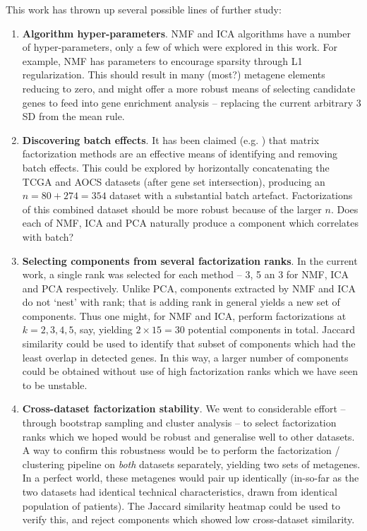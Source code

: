 \documentclass[draft, tikz, 12pt,a4paper,oneside,fleqn]{article}
\begin{document}
This work has thrown up several possible lines of further study:
\begin{enumerate}
\item
{\bf Algorithm hyper-parameters}.  NMF and ICA algorithms have a number of hyper-parameters, only a few of which were explored in this work.  For example, NMF has parameters to encourage sparsity through L1 regularization.   This should result in many (most?) metagene elements reducing to zero, and might offer a more robust means of selecting candidate genes to feed into gene enrichment analysis -- replacing the current arbitrary 3 SD from the mean rule.
\item
{\bf Discovering batch effects}.  It has been claimed (e.g. \cite{Stein-OBrien2018}) that matrix factorization methods are an effective means of identifying and removing batch effects.  This could be explored by horizontally concatenating the TCGA and AOCS datasets (after gene set intersection), producing an $n=80+274=354$ dataset with a substantial batch artefact.  Factorizations of this combined dataset should be more robust because of the larger $n$.  Does each of NMF, ICA and PCA naturally produce a component which correlates with batch?
\item
{\bf Selecting components from several factorization ranks}.
In the current work, a single rank was selected for each method -- 3, 5 an 3 for NMF, ICA and PCA respectively.  Unlike PCA, components extracted by NMF and ICA  do not `nest' with rank; that is adding rank in general yields a new set of components.  Thus one might, for NMF and ICA, perform factorizations at $k=2,3,4,5$, say, yielding $2 \times 15 = 30$ potential components in total.  Jaccard similarity could be used to identify that subset of components which had the least overlap in detected genes.   In this way, a larger number of components could be obtained without use of high factorization ranks which we have seen to be unstable.
\item
{\bf Cross-dataset factorization stability}.  We went to considerable effort -- through bootstrap sampling and cluster analysis -- to select factorization ranks which we hoped would be robust and generalise well to other datasets.   A way to confirm this robustness would be to perform the factorization / clustering pipeline on \emph{both} datasets separately, yielding two sets of metagenes.  In a perfect world, these metagenes would pair up identically (in-so-far as the two datasets had identical technical characteristics, drawn from identical population of patients).  The Jaccard similarity heatmap could be used to verify this, and reject components which showed low cross-dataset similarity.

\end{enumerate}
\end{document}
